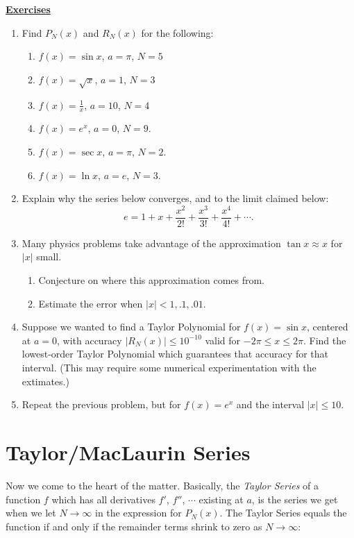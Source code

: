 \eex 
\newpage
\begin{center}{\Large\bf\underline{Exercises}}\end{center}
\begin{multicols}{2}

\begin{enumerate}
\item Find $P_N(x)$ and $R_N(x)$ for the following:
\begin{enumerate}
\item $f(x)=\sin x$, $a=\pi$, $N=5$
\item $f(x)=\sqrt x$, $a=1$, $N=3$
\item $f(x)=\frac1x$, $a=10$, $N=4$
\item $f(x)=e^x$, $a=0$, $N=9$.
\item $f(x)=\sec x$, $a=\pi$, $N=2$.
\item $f(x)=\ln x$, $a=e$, $N=3$.
\end{enumerate}

\item Explain why the series below converges, and to
the limit claimed below:
$$e=1+x+\frac{x^2}{2!}+\frac{x^3}{3!}+\frac{x^4}{4!}+\cdots.$$

\item Many physics problems take advantage of 
the approximation $\tan x\approx x$ for $|x|$ small.
\begin{enumerate}
\item Conjecture on where this approximation comes from.
\item Estimate the error when $|x|<1,.1,.01$.
\end{enumerate}

\item Suppose we wanted to find a Taylor Polynomial for $f(x)=\sin x$,
centered at $a=0$, with accuracy 
$\left|R_N(x)\right|\le10^{-10}$
valid for $-2\pi\le x\le2\pi$. Find the lowest-order 
Taylor Polynomial which guarantees that accuracy
for that interval.  (This may require some numerical experimentation
with the extimates.)

\item Repeat the previous problem, but for $f(x)=e^x$ and the interval
$|x|\le10$.
\end{enumerate}
\end{multicols}




\newpage
\section{Taylor/MacLaurin Series}
\bigskip
Now we come to the heart of the matter.
Basically, the {\it Taylor Series} of a function $f$ which
has all derivatives $f'$, $f''$, $\cdots$ existing at $a$, is
the series we get when we let $N\to\infty$ in the expression
for $P_N(x)$.  The Taylor Series equals the function if and
only if the remainder terms shrink to zero as $N\to\infty$: 

